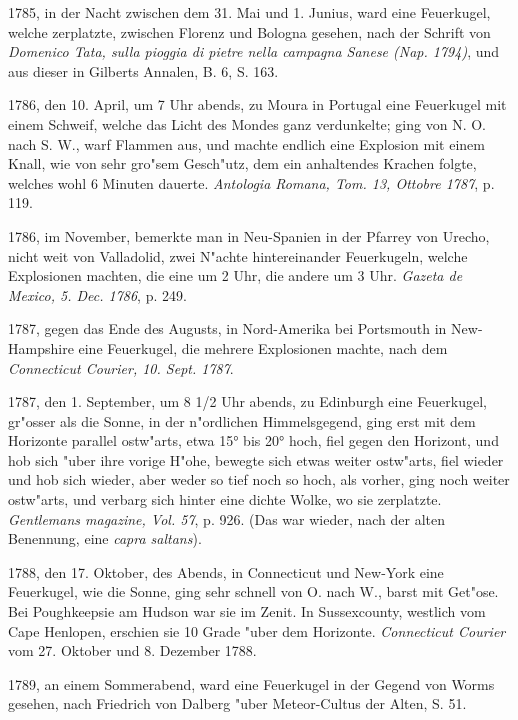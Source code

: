 \documentclass[a4paper, 11pt, oneside, polutonikogreek, german]{article}
\begin{document}
1785, in der Nacht zwischen dem 31. Mai und 1. Junius, ward eine Feuerkugel, welche zerplatzte, zwischen Florenz und Bologna gesehen, nach der Schrift von \emph{Domenico Tata, sulla pioggia di pietre nella campagna Sanese (Nap. 1794)}, und aus dieser in Gilberts Annalen, B. 6, S. 163.

1786, den 10. April, um 7 Uhr abends, zu Moura in Portugal eine Feuerkugel mit einem Schweif, welche das Licht des Mondes ganz verdunkelte; ging von N. O. nach S. W., warf Flammen aus, und machte endlich eine Explosion mit einem Knall, wie von sehr gro"sem Gesch"utz, dem ein anhaltendes Krachen folgte, welches wohl 6 Minuten dauerte. \emph{Antologia Romana, Tom. 13, Ottobre 1787}, p. 119.

1786, im November, bemerkte man in Neu-Spanien in der Pfarrey von Urecho, nicht weit von Valladolid, zwei N"achte hintereinander Feuerkugeln, welche Explosionen machten, die eine um 2 Uhr, die andere um 3 Uhr. \emph{Gazeta de Mexico, 5. Dec. 1786}, p. 249.

1787, gegen das Ende des Augusts, in Nord-Amerika bei Portsmouth in New-Hampshire eine Feuerkugel, die mehrere Explosionen machte, nach dem \emph{Connecticut Courier, 10. Sept. 1787}.

1787, den 1. September, um 8 1/2 Uhr abends, zu Edinburgh eine Feuerkugel, gr"osser als die Sonne, in der n"ordlichen Himmelsgegend, ging erst mit dem Horizonte parallel ostw"arts, etwa 15° bis 20° hoch, fiel gegen den Horizont, und hob sich "uber ihre vorige H"ohe, bewegte sich etwas weiter ostw"arts, fiel wieder und hob sich wieder, aber weder so tief noch so hoch, als vorher, ging noch weiter ostw"arts, und verbarg sich hinter eine dichte Wolke, wo sie zerplatzte. \emph{Gentlemans magazine, Vol. 57}, p. 926. (Das war wieder, nach der alten Benennung, eine \emph{capra saltans}).

1788, den 17. Oktober, des Abends, in Connecticut und New-York eine Feuerkugel, wie die Sonne, ging sehr schnell von O. nach W., barst mit Get"ose. Bei Poughkeepsie am Hudson war sie im Zenit. In Sussexcounty, westlich vom Cape Henlopen, erschien sie 10 Grade "uber dem Horizonte. \emph{Connecticut Courier} vom 27. Oktober und 8. Dezember 1788.

1789, an einem Sommerabend, ward eine Feuerkugel in der Gegend von Worms gesehen, nach Friedrich von Dalberg "uber Meteor-Cultus der Alten, S. 51.
\end{document}
